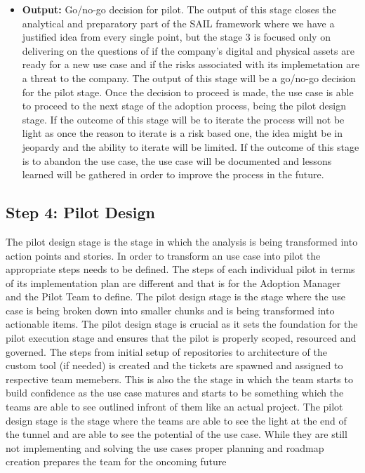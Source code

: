 \documentclass[]{imc-inf}
\def\tightlist{}
\begin{document}
\begin{itemize}
	\tightlist
	\item
	\textbf{Output:} Go/no-go decision for pilot. The output of this stage
	closes the analytical and preparatory part of the SAIL framework where
	we have a justified idea from every single point, but the stage 3 is
	focused only on delivering on the questions of if the company's
	digital and physical assets are ready for a new use case and if the
	risks associated with its implemetation are a threat to the company.
	The output of this stage will be a go/no-go decision for the pilot
	stage. Once the decision to proceed is made, the use case is able to
	proceed to the next stage of the adoption process, being the pilot
	design stage. If the outcome of this stage will be to iterate the
	process will not be light as once the reason to iterate is a risk
	based one, the idea might be in jeopardy and the ability to iterate
	will be limited. If the outcome of this stage is to abandon the use
	case, the use case will be documented and lessons learned will be
	gathered in order to improve the process in the future.
\end{itemize}

\subsection{Step 4: Pilot Design}\label{step-4-pilot-design}

The pilot design stage is the stage in which the analysis is being
transformed into action points and stories. In order to transform an use
case into pilot the appropriate steps needs to be defined. The steps of
each individual pilot in terms of its implementation plan are different
and that is for the Adoption Manager and the Pilot Team to define. The
pilot design stage is the stage where the use case is being broken down
into smaller chunks and is being transformed into actionable items. The
pilot design stage is crucial as it sets the foundation for the pilot
execution stage and ensures that the pilot is properly scoped, resourced
and governed. The steps from initial setup of repositories to
architecture of the custom tool (if needed) is created and the tickets
are spawned and assigned to respective team memebers. This is also the
the stage in which the team starts to build confidence as the use case
matures and starts to be something which the teams are able to see
outlined infront of them like an actual project. The pilot design stage
is the stage where the teams are able to see the light at the end of the
tunnel and are able to see the potential of the use case. While they are
still not implementing and solving the use cases proper planning and
roadmap creation prepares the team for the oncoming future
\end{document}
